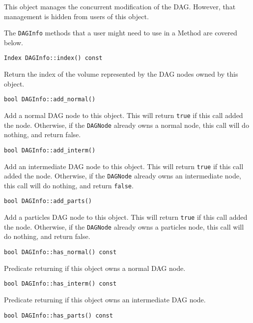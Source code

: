 This object manages the concurrent modification of the DAG. However, that
management is hidden from users of this object.

The \texttt{DAGInfo} methods that a user might need to use in a Method are
covered below.

\begin{lstlisting}
Index DAGInfo::index() const
\end{lstlisting}

\noindent Return the index of the volume represented by the DAG nodes owned by
this object.

\begin{lstlisting}
bool DAGInfo::add_normal()
\end{lstlisting}

\noindent Add a normal DAG node to this object. This will return \texttt{true}
if this call added the node. Otherwise, if the \texttt{DAGNode} already owns a
normal node, this call will do nothing, and return false.

\begin{lstlisting}
bool DAGInfo::add_interm()
\end{lstlisting}

\noindent Add an intermediate DAG node to this object. This will return
\texttt{true} if this call added the node. Otherwise, if the \texttt{DAGNode}
already owns an intermediate node, this call will do nothing, and return
\texttt{false}.

\begin{lstlisting}
bool DAGInfo::add_parts()
\end{lstlisting}

\noindent Add a particles DAG node to this object. This will return
\texttt{true} if this call added the node. Otherwise, if the \texttt{DAGNode}
already owns a particles node, this call will do nothing, and return false.

\begin{lstlisting}
bool DAGInfo::has_normal() const
\end{lstlisting}

\noindent Predicate returning if this object owns a normal DAG node.

\begin{lstlisting}
bool DAGInfo::has_interm() const
\end{lstlisting}

\noindent Predicate returning if this object owns an intermediate DAG node.

\begin{lstlisting}
bool DAGInfo::has_parts() const
\end{lstlisting}

